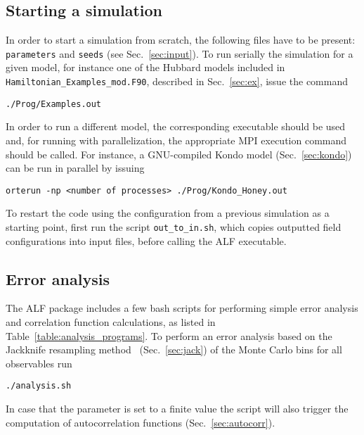 %
\subsection*{Starting a simulation}
%
In order to start a simulation from scratch, the following files have to be present: \texttt{parameters} and \texttt{seeds} (see Sec.~\ref{sec:input}). 
To run serially the simulation for a given model, for instance one of the Hubbard models included in \texttt{Hamiltonian\_Examples\_mod.F90}, described in Sec.~\ref{sec:ex}, issue the command
\begin{lstlisting}[style=bash]
./Prog/Examples.out
\end{lstlisting}
In order to run a different model, the corresponding executable should be used and, for running with parallelization, the appropriate MPI execution command should be called. For instance, a GNU-compiled Kondo model (Sec.~\ref{sec:kondo}) can be run in parallel by issuing  
  \begin{lstlisting}[style=bash]
orterun -np <number of processes> ./Prog/Kondo_Honey.out
\end{lstlisting}


To restart the code using the configuration from a previous simulation as a starting point, first run the script \texttt{out\_to\_in.sh}, which copies outputted field configurations into input files, before calling the ALF executable.

%
\subsection{Error analysis}\label{sec:analysis}
%

The ALF package includes a few bash scripts for performing simple error analysis and correlation function calculations, as listed in Table~\ref{table:analysis_programs}. 
To perform an error analysis based on the Jackknife resampling method~\cite{efron1981} (Sec.~\ref{sec:jack}) of the Monte Carlo bins for all observables run
\begin{lstlisting}[style=bash]
./analysis.sh
\end{lstlisting}
In case that the parameter  is set to a finite value the script will also trigger the computation of autocorrelation functions (Sec.~\ref{sec:autocorr}).

